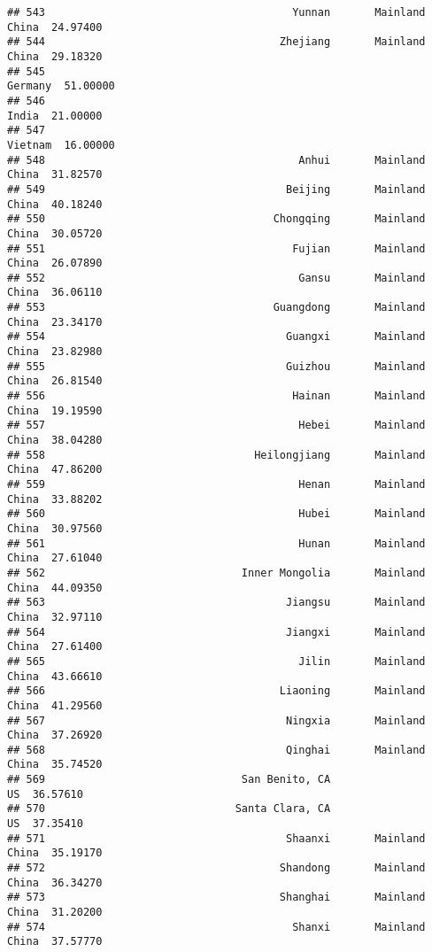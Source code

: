 \documentclass[
]{article}
\begin{document}
\begin{verbatim}
## 543                                       Yunnan       Mainland China  24.97400
## 544                                     Zhejiang       Mainland China  29.18320
## 545                                                           Germany  51.00000
## 546                                                             India  21.00000
## 547                                                           Vietnam  16.00000
## 548                                        Anhui       Mainland China  31.82570
## 549                                      Beijing       Mainland China  40.18240
## 550                                    Chongqing       Mainland China  30.05720
## 551                                       Fujian       Mainland China  26.07890
## 552                                        Gansu       Mainland China  36.06110
## 553                                    Guangdong       Mainland China  23.34170
## 554                                      Guangxi       Mainland China  23.82980
## 555                                      Guizhou       Mainland China  26.81540
## 556                                       Hainan       Mainland China  19.19590
## 557                                        Hebei       Mainland China  38.04280
## 558                                 Heilongjiang       Mainland China  47.86200
## 559                                        Henan       Mainland China  33.88202
## 560                                        Hubei       Mainland China  30.97560
## 561                                        Hunan       Mainland China  27.61040
## 562                               Inner Mongolia       Mainland China  44.09350
## 563                                      Jiangsu       Mainland China  32.97110
## 564                                      Jiangxi       Mainland China  27.61400
## 565                                        Jilin       Mainland China  43.66610
## 566                                     Liaoning       Mainland China  41.29560
## 567                                      Ningxia       Mainland China  37.26920
## 568                                      Qinghai       Mainland China  35.74520
## 569                               San Benito, CA                   US  36.57610
## 570                              Santa Clara, CA                   US  37.35410
## 571                                      Shaanxi       Mainland China  35.19170
## 572                                     Shandong       Mainland China  36.34270
## 573                                     Shanghai       Mainland China  31.20200
## 574                                       Shanxi       Mainland China  37.57770

\end{verbatim}
\end{document}
